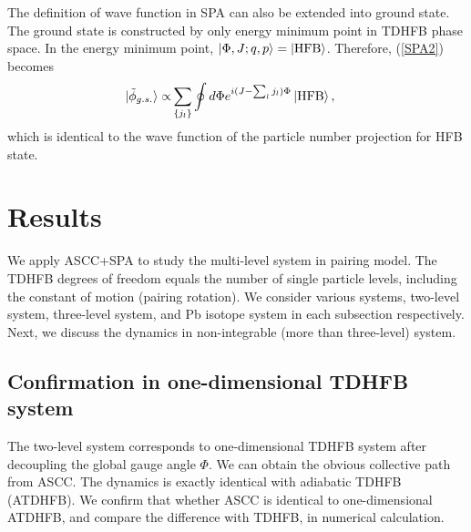 \documentclass[%
superscriptaddress,
showpacs,
nofootinbib,
amsmath,amssymb,
aps,
prc,
twocolumn,
floatfix ]%
{revtex4-1}
\begin{document}
The definition of wave function in SPA can also be extended into ground state. The ground state is constructed by only energy minimum point in TDHFB phase space. In the energy minimum point, $\ket{\Phi,J;q,p}=\ket{\rm HFB}$. Therefore, (\ref{SPA2}) becomes
\begin{align}
 \ket{\tilde{\phi}_{g.s.}} \propto& \sum_{\{j_l\}} \oint d\Phi e^{i(J-\sum_l j_l)\Phi} \ket{\rm HFB},  
\end{align}
which is identical to the wave function of the particle number projection for HFB state.


\section{Results}
\label{sec4}
We apply ASCC+SPA to study the multi-level system in pairing model. The TDHFB degrees of freedom equals the number of single particle levels, including the constant of motion (pairing rotation). We consider various systems, two-level system, three-level system, and Pb isotope system in each subsection respectively. Next, we discuss the dynamics in non-integrable (more than three-level) system.  


\subsection{Confirmation in one-dimensional TDHFB system}
The two-level system corresponds to one-dimensional TDHFB system after decoupling the global gauge angle $\Phi$. We can obtain the obvious collective path from ASCC. The dynamics is exactly identical with adiabatic TDHFB (ATDHFB). We confirm that whether ASCC is identical to one-dimensional ATDHFB, and compare the difference with TDHFB, in numerical calculation.
\end{document}
